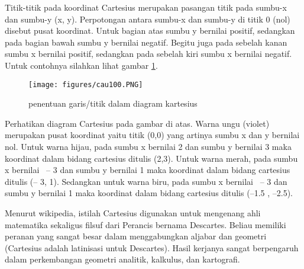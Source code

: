 Titik-titik pada koordinat Cartesius merupakan pasangan titik pada sumbu-x dan sumbu-y (x, y). Perpotongan antara sumbu-x dan sumbu-y di titik 0 (nol) disebut pusat koordinat. Untuk bagian atas sumbu y bernilai positif, sedangkan pada bagian bawah sumbu y bernilai negatif. Begitu juga pada sebelah kanan sumbu x bernilai positif, sedangkan pada sebelah kiri sumbu x bernilai negatif. Untuk contohnya silahkan lihat gambar \ref{cau100}. 
\begin{figure}[ht]
	\centerline{\texttt{[image: figures/cau100.PNG]}}
	\caption{penentuan garis/titik dalam diagram kartesius}
	\label{cau100}
	\end{figure}

Perhatikan diagram Cartesius pada gambar di atas. Warna ungu (violet) merupakan pusat koordinat yaitu titik (0,0) yang artinya sumbu x dan y bernilai nol. Untuk warna hijau, pada sumbu x bernilai 2 dan sumbu y bernilai 3 maka koordinat dalam bidang cartesius ditulis (2,3). Untuk warna merah, pada sumbu x bernilai  – 3 dan sumbu y bernilai 1 maka koordinat dalam bidang cartesius ditulis (– 3, 1). Sedangkan untuk warna biru, pada sumbu x bernilai  – 3 dan sumbu y bernilai 1 maka koordinat dalam bidang cartesius ditulis (–1.5 , –2.5).

Menurut wikipedia, istilah Cartesius digunakan untuk mengenang ahli matematika sekaligus filsuf dari Perancis bernama Descartes. Beliau memiliki peranan yang sangat besar dalam menggabungkan aljabar dan geometri (Cartesius adalah latinisasi untuk Descartes). Hasil kerjanya sangat berpengaruh dalam perkembangan geometri analitik, kalkulus, dan kartografi.


